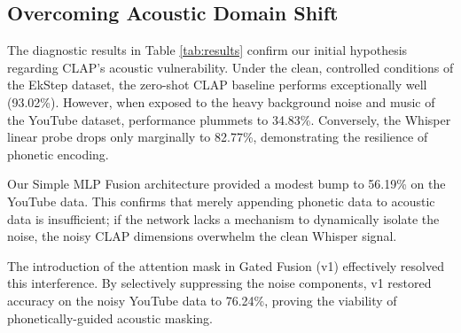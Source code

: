 \documentclass[conference]{IEEEtran}
\begin{document}
\begin{table}[t]
\centering
\caption{Zero-Shot Language Identification Accuracy (\%)}
\label{tab:results}
\end{table}

\subsection{Overcoming Acoustic Domain Shift}
The diagnostic results in Table \ref{tab:results} confirm our initial hypothesis regarding CLAP's acoustic vulnerability. Under the clean, controlled conditions of the EkStep dataset, the zero-shot CLAP baseline performs exceptionally well (93.02\%). However, when exposed to the heavy background noise and music of the YouTube dataset, performance plummets to 34.83\%. Conversely, the Whisper linear probe drops only marginally to 82.77\%, demonstrating the resilience of phonetic encoding.

Our Simple MLP Fusion architecture provided a modest bump to 56.19\% on the YouTube data. This confirms that merely appending phonetic data to acoustic data is insufficient; if the network lacks a mechanism to dynamically isolate the noise, the noisy CLAP dimensions overwhelm the clean Whisper signal. 

The introduction of the attention mask in Gated Fusion (v1) effectively resolved this interference. By selectively suppressing the noise components, v1 restored accuracy on the noisy YouTube data to 76.24\%, proving the viability of phonetically-guided acoustic masking.
\end{document}
